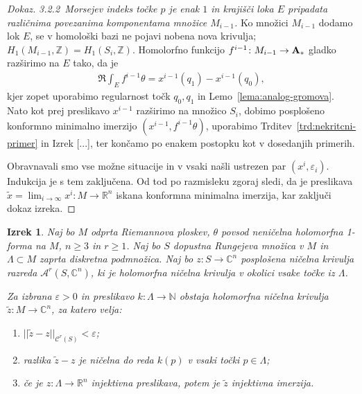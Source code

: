 \documentclass[12pt,a4paper,twoside]{article}
\theoremstyle{definition} %
\newenvironment{dokaz}[1][Dokaz]{\begin{proof}[#1]}{\end{proof}}
\theoremstyle{plain} %
\newtheorem{izrek}[definicija]{Izrek}
\numberwithin{equation}{section}  %
\newcommand{\R}{\mathbb R}
\newcommand{\N}{\mathbb N}
\newcommand{\C}{\mathbb C}
\begin{document}
\begin{dokaz}
\textit{3.2.2~Morsejev indeks točke $p$ je enak $1$ in krajišči loka $E$ pripadata različnima povezanima komponentama množice $M_{i-1}$.} \newline
Ko množici $M_{i-1}$ dodamo lok $E$, se v homološki bazi ne pojavi nobena nova krivulja; $H_{1}(M_{i-1}, \mathbb{Z}) = H_{1}(S_{i}, \mathbb{Z})$.
Homolorfno funkcijo $f^{i-1} \colon M_{i-1} \to \textup{\textbf{A}}_{*}$ gladko razširimo na $E$ tako, da je
\begin{gather*}
\Re \int_{E} f^{i-1} \theta = x^{i-1}(q_1) - x^{i-1}(q_0),
\end{gather*}
kjer zopet uporabimo regularnost točk $q_0, q_1$ in Lemo~\ref{lema:analog-gromova}.
Nato kot prej preslikavo $x^{i-1}$ razširimo na množico $S_{i}$, dobimo posplošeno konformno minimalno imerzijo $(x^{i-1}, f^{i-1} \theta)$, uporabimo Trditev~\ref{trd:nekritcni-primer} in Izrek [...], %
ter končamo po enakem postopku kot v dosedanjih primerih. \newline

Obravnavali smo vse možne situacije in v vsaki našli ustrezen par $(x^{i}, \varepsilon_{i})$. Indukcija je s tem zaključena. Od tod po razmisleku zgoraj sledi, da je preslikava $\tilde{x} = \lim_{i \to \infty} x^{i} \colon M \to \mathbb{R}^{n}$ iskana konformna minimalna imerzija, kar zaključi dokaz izreka.
\end{dokaz}

\begin{izrek} \label{izr:glavni-izrek-NC}
Naj bo $M$ odprta Riemannova ploskev, $\theta$ povsod neničelna holomorfna 1-forma na $M$, $n \geq 3$ in $r \geq 1$.
Naj bo $S$ dopustna Rungejeva množica v $M$ in $\Lambda \subset M$ zaprta diskretna podmnožica. 
Naj bo $z \colon S \to \C^{n}$ posplošena ničelna krivulja razreda $\mathcal{A}^{r}(S, \C^{n})$, ki je holomorfna ničelna krivulja v okolici vsake točke iz $\Lambda$.

Za izbrana $\varepsilon > 0$ in preslikavo $k \colon \Lambda \to \N$ obstaja holomorfna ničelna krivulja $\tilde{z} \colon M \to \C^{n}$, za katero velja:
\begin{enumerate}
\item $||\tilde{z} - z||_{\mathcal{C}^{r}(S)} < \varepsilon$;
\item razlika $\tilde{z}-z$ je ničelna do reda $k(p)$ v vsaki točki $p\in \Lambda$;
\item če je $z \colon \Lambda \to \R^{n}$ injektivna preslikava, potem je $\tilde{z}$ injektivna imerzija.
\end{enumerate}
\end{izrek}
\end{document}
